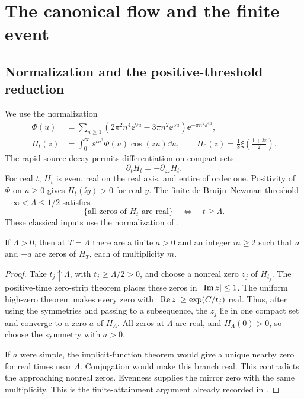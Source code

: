 \section{The canonical flow and the finite event}\label{sec:geometry}

\subsection{Normalization and the positive-threshold reduction}

We use the normalization
\begin{align}
 \Phi(u)&=\sum_{n\ge1}
 (2\pi^2n^4\ee^{9u}-3\pi n^2\ee^{5u})
 \ee^{-\pi n^2\ee^{4u}},\label{eq:source}\\
 H_t(z)&=\int_0^\infty \ee^{tu^2}\Phi(u)\cos(zu)\dd u,\qquad
 H_0(z)=\frac18\xi\!\left(\frac{1+\ii z}{2}\right).
 \label{eq:flow}
\end{align}
The rapid source decay permits differentiation on compact sets:
\begin{equation}\label{eq:heat}
 \partial_t H_t=-\partial_{zz}H_t.
\end{equation}
For real \(t\), \(H_t\) is even, real on the real axis, and entire of
order one. Positivity of \(\Phi\) on \(u\ge0\) gives
\(H_t(\ii y)>0\) for real \(y\). The finite de Bruijn--Newman threshold
\(-\infty<\Lambda\le1/2\) satisfies
\begin{equation}\label{eq:threshold}
 \{\text{all zeros of }H_t\text{ are real}\} \quad\Longleftrightarrow\quad
 t\ge\Lambda.
\end{equation}
These classical inputs use the normalization of \cite{polymath}.

\begin{proposition}\label{prop:finite}
If \(\Lambda>0\), then at \(T=\Lambda\) there are a finite \(a>0\)
and an integer \(m\ge2\) such that \(a\) and \(-a\) are zeros of
\(H_T\), each of multiplicity \(m\).
\end{proposition}
\begin{proof}
Take \(t_j\uparrow\Lambda\), with \(t_j\ge\Lambda/2>0\), and choose a
nonreal zero \(z_j\) of \(H_{t_j}\). The positive-time zero-strip theorem
places these zeros in \(|\operatorname{Im} z|\le1\). The uniform high-zero theorem
\cite[Theorem 1.5(i)]{polymath} makes every zero with
\(|\operatorname{Re} z|\ge\exp(C/t_j)\) real. Thus, after using the symmetries and
passing to a subsequence, the \(z_j\) lie in one compact set and converge
to a zero \(a\) of \(H_\Lambda\). All zeros at \(\Lambda\) are real, and
\(H_\Lambda(0)>0\), so choose the symmetry with \(a>0\).

If \(a\) were simple, the implicit-function theorem would give a unique
nearby zero for real times near \(\Lambda\). Conjugation would make this
branch real. This contradicts the approaching nonreal zeros. Evenness
supplies the mirror zero with the same multiplicity. This is the
finite-attainment argument already recorded in \cite{collision}.
\end{proof}

